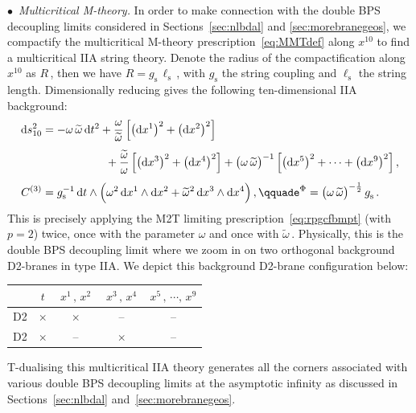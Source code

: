 \documentclass[11pt]{article}
\renewcommand{\tilde}[1]{\widetilde{#1}}
\renewcommand{\emph}[1]{\textit{#1}}
\newcommand{\dd}{\mathrm{d}}
\begin{document}
\noindent $\bullet$~\emph{Multicritical M-theory.} In order to make connection with the double BPS decoupling limits considered in Sections~\ref{sec:nlbdal} and \ref{sec:morebranegeos}, we compactify the multicritical M-theory prescription~\eqref{eq:MMTdef} along $x^{10}$ to find a multicritical IIA string theory. Denote the radius of the compactification along $x^{10}$ as $R$\,, then we have $R = g^{}_\text{s} \, \ell^{}_\text{s}$\,, with $g^{}_\text{s}$ the string coupling and $\ell^{}_\text{s}$ the string length. Dimensionally reducing gives the following ten-dimensional IIA background: \begin{subequations} \label{eq:mdtdt}
\begin{align} 
	\dd s^2_{10} & = - \omega \, \tilde{\omega} \, \dd t^2 + \frac{\omega}{\tilde{\omega}} \, \Bigl[ \bigl( \dd x^1 \bigr)^2 + \bigl( \dd x^2 \bigr)^2 \Bigr] \notag \\[4pt]
    & \hspace{1.98cm} + \frac{\tilde{\omega}}{\omega} \, \Bigl[ \bigl( \dd x^3 \bigr)^2 + \bigl( \dd x^4 \bigr)^2 \Bigr]  + \bigl( \omega \, \tilde{\omega} \bigr)^{-1} \, \Bigl[ \bigl( \dd x^5 \bigr)^2 + \cdots + \bigl( \dd x^{9} \bigr)^2 \Bigr]\,, \\[4pt] 
    C^{(3)} & = g^{-1}_\text{s} \, \dd t \wedge \Bigl( \omega^2 \, \dd x^1 \wedge \dd x^2 + \tilde{\omega}^2 \, \dd x^3 \wedge \dd x^4 \Bigr)\,,
        \qquad%
    e^\Phi = \bigl( \omega \, \tilde{\omega} \bigr)^{- \frac{1}{2}} \, g^{}_\text{s}\,.
\end{align}
\end{subequations}
%
This is precisely applying the M2T limiting prescription~\eqref{eq:rpgcfbmpt} (with $p=2$) twice, once with the parameter $\omega$ and once with $\tilde{\omega}$\,. Physically, this is the double BPS decoupling limit where we zoom in on two orthogonal background D2-branes in type IIA. We depict this background D2-brane configuration below:
%
\begin{center}
\begin{tabular}{c|c|c|c|c}
& $t$ & \,$x^1\,, \, x^2$\, & \,$x^3\,, \, x^4$\, & $x^5\,, \, \cdots, \, x^9$ \\[2pt]
\hline 
D2 & $\times$ & $\times$ & -- & -- \\[2pt]
D2 & $\times$ & -- & $\times$ & -- 
\end{tabular}
\end{center}
%
T-dualising this multicritical IIA theory generates all the corners associated with various double BPS decoupling limits at the asymptotic infinity as discussed in Sections~\ref{sec:nlbdal} and~\ref{sec:morebranegeos}.
\end{document}
